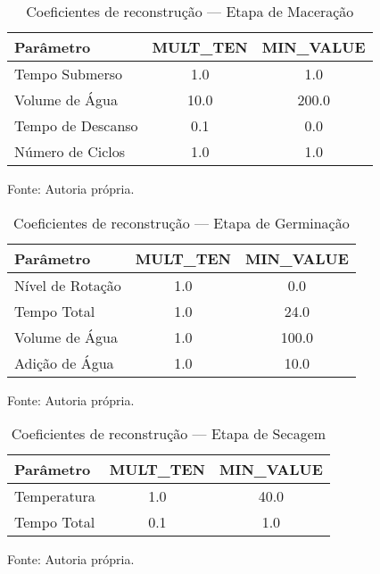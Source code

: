 \begin{table}[H]
    \caption{Coeficientes de reconstrução — Etapa de Maceração}
    \label{tab:coefmac}
    \centering
    \begin{tabular}{lcc}
        \hline
        \bfseries Parâmetro & \bfseries MULT\_TEN & \bfseries MIN\_VALUE \\
        \hline
        Tempo Submerso     & 1.0  & 1.0   \\
        Volume de Água     & 10.0 & 200.0 \\
        Tempo de Descanso  & 0.1  & 0.0   \\
        Número de Ciclos   & 1.0  & 1.0   \\
        \hline
    \end{tabular}
    
    {\centering\footnotesize Fonte: Autoria própria.\par}
\end{table}

\begin{table}[H]
    \caption{Coeficientes de reconstrução — Etapa de Germinação}
    \label{tab:coefgerm}
    \centering
    \begin{tabular}{lcc}
        \hline
        \bfseries Parâmetro & \bfseries MULT\_TEN & \bfseries MIN\_VALUE \\
        \hline
        Nível de Rotação    & 1.0 & 0.0  \\
        Tempo Total         & 1.0 & 24.0 \\
        Volume de Água      & 1.0 & 100.0 \\
        Adição de Água      & 1.0 & 10.0 \\
        \hline
    \end{tabular}
    
    {\centering\footnotesize Fonte: Autoria própria.\par}
\end{table}

\begin{table}[H]
    \caption{Coeficientes de reconstrução — Etapa de Secagem}
    \label{tab:coefsec}
    \centering
    \begin{tabular}{lcc}
        \hline
        \bfseries Parâmetro & \bfseries MULT\_TEN & \bfseries MIN\_VALUE \\
        \hline
        Temperatura  & 1.0 & 40.0 \\
        Tempo Total  & 0.1 & 1.0  \\
        \hline
    \end{tabular}
    
    {\centering\footnotesize Fonte: Autoria própria.\par}
\end{table}


